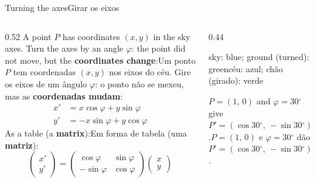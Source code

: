 \documentclass[aspectratio=169,11pt]{beamer}
\newcommand{\tr}[2]{\ifEN#2\else#1\fi}
\newcommand{\bnum}[1]{\textbf{\textcolor{mTeal}{#1}}}
\newcommand{\gr}{\ensuremath{{}^{\circ}}}
\begin{document}
\begin{frame}{\tr{Girar os eixos}{Turning the axes}}
  \begin{columns}[T]
    \begin{column}{0.52\textwidth}
      \small
      \tr{Um ponto $P$ tem coordenadas $(x,y)$ nos eixos do céu. Gire os eixos de um ângulo $\varphi$: o ponto não se mexeu, mas as \bnum{coordenadas mudam}:}{A point $P$ has coordinates $(x,y)$ in the sky axes. Turn the axes by an angle $\varphi$: the point did not move, but the \bnum{coordinates change}:}
      \[ \begin{aligned} x' &= x\cos\varphi + y\sin\varphi \\ y' &= -x\sin\varphi + y\cos\varphi \end{aligned} \]
      \tr{Em forma de tabela (uma \bnum{matriz}):}{As a table (a \bnum{matrix}):}
      \[ \begin{pmatrix} x' \\ y' \end{pmatrix} = \begin{pmatrix} \cos\varphi & \sin\varphi \\ -\sin\varphi & \cos\varphi \end{pmatrix} \begin{pmatrix} x \\ y \end{pmatrix} \]
    \end{column}
    \begin{column}{0.44\textwidth}
      \centering
      \par
      {\scriptsize\textcolor{mStoneMid}{\tr{céu: azul; chão (girado): verde}{sky: blue; ground (turned): green}}}
      \smallskip
      \begin{ideia}[title={\tr{Exemplo}{Example}}]
        \footnotesize\tr{$P = (1,\,0)$ e $\varphi = 30\gr$ dão $P' = (\cos30\gr,\,-\sin30\gr) = (\num{0.866},\,\num{-0.5})$.}{$P = (1,\,0)$ and $\varphi = 30\gr$ give $P' = (\cos30\gr,\,-\sin30\gr) = (\num{0.866},\,\num{-0.5})$.}
      \end{ideia}
    \end{column}
  \end{columns}
\end{frame}
\end{document}
